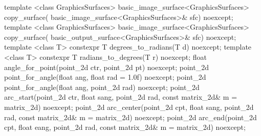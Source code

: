 \begin{codeblock}
{{{{    template <class GraphicsSurfaces>
    basic_image_surface<GraphicsSurfaces> copy_surface(
      basic_image_surface<GraphicsSurfaces>& sfc) noexcept;
    template <class GraphicsSurfaces>
    basic_image_surface<GraphicsSurfaces> copy_surface(
      basic_output_surface<GraphicsSurfaces>& sfc) noexcept;
    template <class T>
    constexpr T degrees_to_radians(T d) noexcept;
    template <class T>
    constexpr T radians_to_degrees(T r) noexcept;
    float angle_for_point(point_2d ctr, point_2d pt) noexcept;
    point_2d point_for_angle(float ang, float rad = 1.0f) noexcept;
    point_2d point_for_angle(float ang, point_2d rad) noexcept;
    point_2d arc_start(point_2d ctr, float sang, point_2d rad, 
      const matrix_2d& m = matrix_2d{}) noexcept;
    point_2d arc_center(point_2d cpt, float sang, point_2d rad, 
      const matrix_2d& m = matrix_2d{}) noexcept;
    point_2d arc_end(point_2d cpt, float eang, point_2d rad, 
      const matrix_2d& m = matrix_2d{}) noexcept;
} } } }

\end{codeblock}
%
